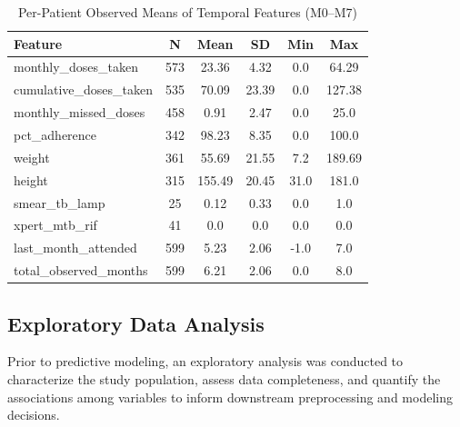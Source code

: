 \documentclass[12pt]{article}
\begin{document}
\begin{table}[htbp]

\caption{Per-Patient Observed Means of Temporal Features (M0–M7)}
\label{tab:temporal_feature_descriptive_stats}
\begin{tabular}{lccccc}

\toprule

Feature & N & Mean & SD & Min & Max \\

\midrule

monthly\_doses\_taken & 573 & 23.36 & 4.32 & 0.0 & 64.29 \\
cumulative\_doses\_taken & 535 & 70.09 & 23.39 & 0.0 & 127.38 \\
monthly\_missed\_doses & 458 & 0.91 & 2.47 & 0.0 & 25.0 \\
pct\_adherence & 342 & 98.23 & 8.35 & 0.0 & 100.0 \\
weight & 361 & 55.69 & 21.55 & 7.2 & 189.69 \\
height & 315 & 155.49 & 20.45 & 31.0 & 181.0 \\
smear\_tb\_lamp & 25 & 0.12 & 0.33 & 0.0 & 1.0 \\
xpert\_mtb\_rif & 41 & 0.0 & 0.0 & 0.0 & 0.0 \\
last\_month\_attended & 599 & 5.23 & 2.06 & -1.0 & 7.0 \\
total\_observed\_months & 599 & 6.21 & 2.06 & 0.0 & 8.0 \\

\bottomrule

\end{tabular}

\end{table}



\subsection{Exploratory Data Analysis}

Prior to predictive modeling, an exploratory analysis was conducted to characterize the study population, assess data completeness, and quantify the associations among variables to inform downstream preprocessing and modeling decisions.
\end{document}

